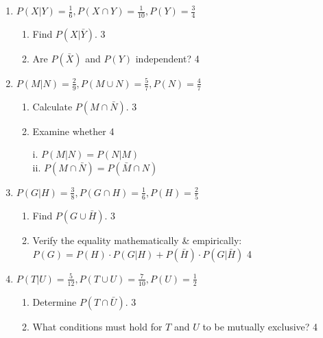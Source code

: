 \documentclass[a4paper,oneside, margin=1.4in]{book}
\begin{document}
\begin{enumerate}
\item \textbf{\( P(X \vert Y) = \frac{1}{6}, P(X \cap Y) = \frac{1}{10}, P(Y) = \frac{3}{4} \)}

\begin{enumerate}
    \item Find \( P(X \vert \bar{Y}) \). \hfill 3
    \item Are $P(\bar X)$ and $P(Y)$ independent? \hfill 4
\end{enumerate}

\item \textbf{\( P(M \vert N) = \frac{2}{9}, P(M \cup N) = \frac{5}{7}, P(N) = \frac{4}{7} \)}

\begin{enumerate}
    \item Calculate \( P(M \cap \bar{N}) \). \hfill 3
    \item Examine whether   \hfill 4
    
    i. $P(M \vert N) = P(N \vert M)$ \\
    ii. $P(M \cap \bar N) = P(\bar M \cap N)$

\end{enumerate}

\item \textbf{\( P(G \vert H) = \frac{3}{8}, P(G \cap H) = \frac{1}{6}, P(H) = \frac{2}{5} \)}

\begin{enumerate}
    \item Find \( P(G \cup \bar{H}) \). \hfill 3
	\item Verify the equality mathematically \& empirically: \\ $P(G) = P(H) \cdot P(G \vert H) + P(\bar H) \cdot P(G \vert \bar H)$ \hfill 4
\end{enumerate}

\item \textbf{\( P(T \vert U) = \frac{5}{12}, P(T \cup U) = \frac{7}{10}, P(U) = \frac{1}{2} \)}

\begin{enumerate}
    \item Determine \( P(T \cap \bar{U}) \). \hfill 3
    \item What conditions must hold for \( T \) and \( U \) to be mutually exclusive? \hfill 4
\end{enumerate}



  \end{enumerate}
\end{document}
